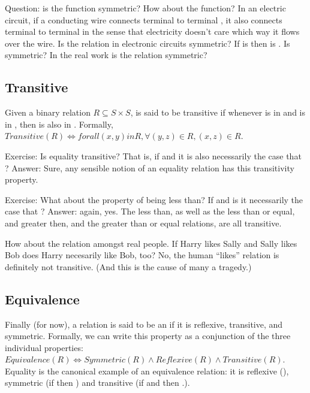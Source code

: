 \documentclass[letterpaper,10pt,english]{sphinxmanual}
\begin{document}
Question: is the function  symmetric? How about the 
function? In an electric circuit, if a conducting wire connects
terminal  to terminal , it also connects terminal  to
terminal  in the sense that electricity doesn’t care which way it
flows over the wire. Is the  relation in electronic circuits
symmetric? If  is   then  is  . Is 
symmetric? In the real work is the  relation symmetric?


\subsection{Transitive}
\label{\detokenize{07-set-theory:transitive}}
Given a binary relation \(R \subseteq S \times S\),  is said to
be transitive if whenever  is in  and  is in ,
then  is also in . Formally, \(Transitive(R) \iff
forall (x,y) in R, \forall (y,z) \in R, (x,z) \in R\).

Exercise: Is equality transitive? That is, if  and  it
is also necessarily the case that ? Answer: Sure, any sensible
notion of an equality relation has this transitivity property.

Exercise: What about the property of being less than? If  and
 is it necessarily the case that ? Answer: again,
yes. The less than, as well as the less than or equal, and greater
then, and the greater than or equal relations, are all transitive.

How about the  relation amongst real people. If Harry likes
Sally and Sally likes Bob does Harry necesarily like Bob, too? No, the
human “likes” relation is definitely not transitive. (And this is the
cause of many a tragedy.)


\subsection{Equivalence}
\label{\detokenize{07-set-theory:equivalence}}
Finally (for now), a relation is said to be an 
if it is reflexive, transitive, and symmetric. Formally, we can write
this property as a conjunction of the three individual properties:
\(Equivalence(R) \iff Symmetric(R) \land Reflexive(R) \land
Transitive(R)\). Equality is the canonical example of an equivalence
relation: it is reflexive (), symmetric (if  then ) and transitive (if  and  then .).
\end{document}
